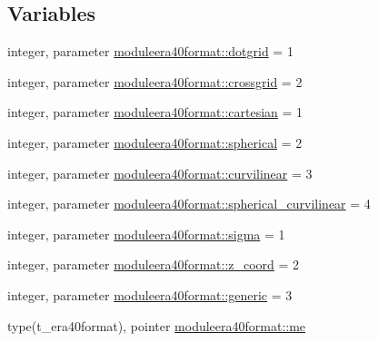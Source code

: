\subsection*{Variables}
\begin{DoxyCompactItemize}
\item 
integer, parameter \mbox{\hyperlink{namespacemoduleera40format_a8abaf8c6f9802ba0e7e994aa019dbfd9}{moduleera40format\+::dotgrid}} = 1
\item 
integer, parameter \mbox{\hyperlink{namespacemoduleera40format_a81534a4bbb190281637fa42199fb3c9e}{moduleera40format\+::crossgrid}} = 2
\item 
integer, parameter \mbox{\hyperlink{namespacemoduleera40format_a42e5afd967f2051f48175fd48cbcaeab}{moduleera40format\+::cartesian}} = 1
\item 
integer, parameter \mbox{\hyperlink{namespacemoduleera40format_ad0e35072a96590a2ebaa186af57b70e2}{moduleera40format\+::spherical}} = 2
\item 
integer, parameter \mbox{\hyperlink{namespacemoduleera40format_ad3784d422598dc6566016fdb9451fd5d}{moduleera40format\+::curvilinear}} = 3
\item 
integer, parameter \mbox{\hyperlink{namespacemoduleera40format_a0193f3c82de3eb7dc7ce15df95940bb5}{moduleera40format\+::spherical\+\_\+curvilinear}} = 4
\item 
integer, parameter \mbox{\hyperlink{namespacemoduleera40format_a79506ec89444ea59431e76f12f1daf20}{moduleera40format\+::sigma}} = 1
\item 
integer, parameter \mbox{\hyperlink{namespacemoduleera40format_ae4ff4503bcd3d89b98e392ca67b2ef13}{moduleera40format\+::z\+\_\+coord}} = 2
\item 
integer, parameter \mbox{\hyperlink{namespacemoduleera40format_aa7e1f8ccfef24db2e6226011a47b2b88}{moduleera40format\+::generic}} = 3
\item 
type(t\+\_\+era40format), pointer \mbox{\hyperlink{namespacemoduleera40format_a991250a617c86efee2eeaeecf12cee05}{moduleera40format\+::me}}
\end{DoxyCompactItemize}
